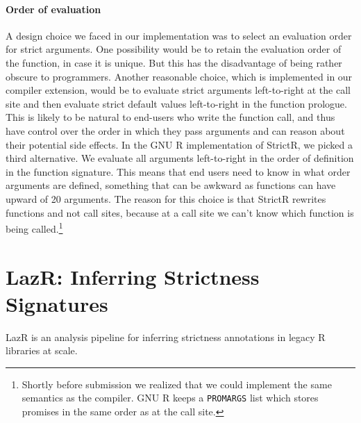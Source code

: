 \documentclass[review,nonacm,screen,acmsmall,anonymous=true]{acmart}
\renewcommand{\c}[1]{\lstinline |#1|\xspace}
\newcommand{\strictr}{{\sf StrictR}\xspace}
\newcommand{\lazr}{{\sf LazR}\xspace}
\begin{document}
\paragraph{Order of evaluation} A design choice we faced in our
implementation was to select an evaluation order for strict arguments. One
possibility would be to retain the evaluation order of the function, in case it
is unique. But this has the disadvantage of being rather obscure to programmers.
Another reasonable choice, which is implemented in our compiler extension, would
be to evaluate strict arguments left-to-right at the call site and then evaluate
strict default values left-to-right in the function prologue. This is likely to
be natural to end-users who write the function call, and thus have control over the
order in which they pass arguments and can reason about their potential side
effects. In the GNU R implementation of \strictr, we picked a third alternative.
We evaluate all arguments left-to-right in the order of definition in the
function signature. This means that end users need to know in what order
arguments are defined, something that can be awkward as functions can have
upward of 20 arguments. The reason for this choice is that \strictr rewrites
functions and not call sites, because at a call site we
can't know which function is being called.\footnote{Shortly before submission we
realized that we could implement the same semantics as the compiler. GNU R keeps a
\c{PROMARGS} list which stores promises in the same order as at the call site.}

\section{LazR: Inferring Strictness Signatures}\label{sec:lazr}

\lazr is an analysis pipeline for inferring strictness annotations in legacy R
libraries at scale.
\end{document}
